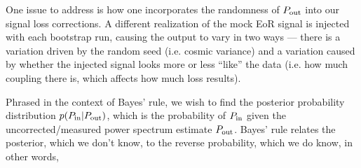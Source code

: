 \documentclass[preprint2,numberedappendix,tighten]{aastex6}  %
\newcommand{\phat}{\widehat{\mathbf{p}}}
\newcommand{\acl}[1]{{\color{red} \textbf{[ACL:  #1]}}}
\newcommand{\dcj}[1]{{\color{orange} \textbf{[DCJ: #1]}}}
\begin{document}

One issue to address is how one incorporates the randomness of $P_{\rm out}$ into our signal loss corrections. A different realization of the mock EoR signal is injected with each bootstrap run, causing the output to vary in two ways ---  there is a variation driven by the random seed (i.e. cosmic variance) and a variation caused by whether the injected signal looks more or less ``like'' the data (i.e. how much coupling there is, which affects how much loss results).

Phrased in the context of Bayes' rule, we wish to find the posterior probability distribution $p(P_{\rm in} | 
P_{\rm out})$, which is the probability of $P_{\rm in}$ given the uncorrected/measured power spectrum estimate $P_{\rm out}$.  Bayes' rule relates the posterior, which we don't know, to the reverse probability, which we do know, in other words,
\end{document}
